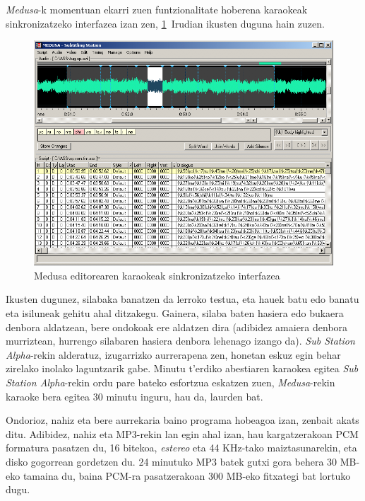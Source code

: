 \textit{Medusa}-k momentuan ekarri zuen funtzionalitate hoberena karaokeak sinkronizatzeko interfazea izan zen, \ref{medusa-karaoke}~Irudian ikusten duguna hain zuzen.
\begin{figure}[htb]
\begin{center}
\includegraphics[width=\columnwidth, natwidth=800pt, natheight=600pt]{Pictures/Chapter2/medusa-karaoke.png}
\caption{Medusa editorearen karaokeak sinkronizatzeko interfazea}
\label{medusa-karaoke}
\end{center}
\end{figure}

Ikusten dugunez, silabaka banatzen da lerroko testua, eta hauek batu edo banatu eta isiluneak gehitu ahal ditzakegu. Gainera, silaba baten hasiera edo bukaera denbora aldatzean, bere ondokoak ere aldatzen dira (adibidez amaiera denbora murriztean, hurrengo silabaren hasiera denbora lehenago izango da). \textit{Sub Station Alpha}-rekin alderatuz, izugarrizko aurrerapena zen, honetan eskuz egin behar zirelako inolako laguntzarik gabe. Minutu t'erdiko abestiaren karaokea egitea \textit{Sub Station Alpha}-rekin ordu pare bateko esfortzua eskatzen zuen, \textit{Medusa}-rekin karaoke bera egitea 30 minutu inguru, hau da, laurden bat.

Ondorioz, nahiz eta bere aurrekaria baino programa hobeagoa izan, zenbait akats ditu. Adibidez, nahiz eta MP3-rekin lan egin ahal izan, hau kargatzerakoan PCM formatura pasatzen du, 16 bitekoa, \textit{estereo} eta 44 KHz-tako maiztasunarekin, eta disko gogorrean gordetzen du. 24 minutuko MP3 batek gutxi gora behera 30 MB-eko tamaina du, baina PCM-ra pasatzerakoan 300 MB-eko fitxategi bat lortuko dugu.

